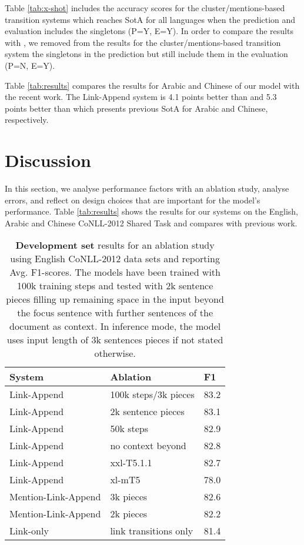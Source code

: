\documentclass[11pt,a4paper]{article}
\newcommand{\LA}{Link-Append}
\newcommand{\M}{Mention-Link-Append}
\newcommand{\LO}{Link-only}
\begin{document}
 Table \ref {tab:x-shot} includes the accuracy scores for the cluster/mentions-based transition systems which reaches SotA for all languages when the prediction and evaluation includes the singletons (P=Y, E=Y). In order to compare the results with , we removed from the results for the cluster/mentions-based transition system the singletons in the prediction but still include them in the evaluation (P=N, E=Y).

Table \ref{tab:results} compares the results for Arabic and Chinese of our model with the recent work. The Link-Append system is 4.1 points better than \cite{min-2021-exploring} and 5.3 points better than \cite{xia-van-durme-2021-moving} which presents previous SotA for Arabic and Chinese, respectively.

 
\section{Discussion}
\label{sec:discussion}

In this section, we analyse performance factors with an ablation study, analyse errors, and reflect on design choices that are important for the model's performance. Table \ref{tab:results} shows the results for our systems on the English, Arabic and Chinese CoNLL-2012 Shared Task and compares with previous work.
\begin{table}[ht]
\centering
\small
\renewcommand{\arraystretch}{1}
\setlength{\tabcolsep}{3.5pt}
\begin{tabular}{l|l|l}
System     & Ablation & F1 \\  \hline
\LA        & 100k steps/3k pieces  &  83.2\\
\LA        & 2k sentence pieces &  83.1\\
\LA        & 50k steps  &  82.9\\
\LA        & no context beyond  &  82.8\\
\LA        & xxl-T5.1.1            &  82.7\\
\LA        & xl-mT5     &  78.0\\ 
\hline
\M        & 3k pieces &   82.6\\ 
\M        & 2k pieces  &  82.2\\ \hline
\LO       & link transitions only  & 81.4 \\ 
\end{tabular}
\caption{{\bf Development set} results for an ablation study using English CoNLL-2012 data sets and reporting Avg. F1-scores. The models have been trained with 100k training steps and tested with 2k sentence pieces filling up remaining space in the input beyond the focus sentence  with further sentences of the document as context. In inference mode, the model uses input length of 3k sentences pieces if not stated otherwise.
\label{tab:ablation}
}
\end{table}
\end{document}
